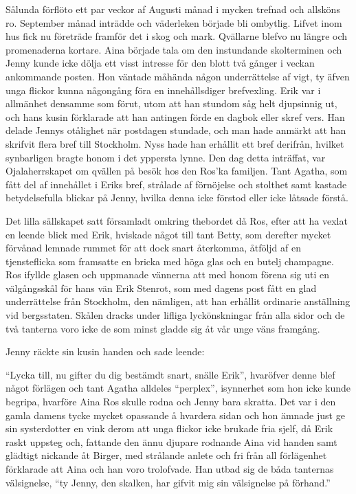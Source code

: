Sålunda förflöto ett par veckor af Augusti månad i mycken trefnad och
allsköns ro. September månad inträdde och väderleken började bli
ombytlig. Lifvet inom hus fick nu företräde framför det i skog och mark.
Qvällarne blefvo nu längre och promenaderna kortare. Aina började tala
om den instundande skolterminen och Jenny kunde icke dölja ett visst
intresse för den blott två gånger i veckan ankommande posten. Hon
väntade måhända någon underrättelse af vigt, ty äfven unga flickor kunna
någongång föra en innehållsdiger brefvexling. Erik var i allmänhet
densamme som förut, utom att han stundom såg helt djupsinnig ut, och
hans kusin förklarade att han antingen förde en dagbok eller skref vers.
Han delade Jennys otålighet när postdagen stundade, och man hade anmärkt
att han skrifvit flera bref till Stockholm. Nyss hade han erhållit ett
bref derifrån, hvilket synbarligen bragte honom i det yppersta lynne.
Den dag detta inträffat, var Ojalaherrskapet om qvällen på besök hos den
Ros'ka familjen. Tant Agatha, som fått del af innehållet i Eriks bref,
strålade af förnöjelse och stolthet samt kastade betydelsefulla blickar
på Jenny, hvilka denna icke förstod eller icke låtsade förstå.

Det lilla sällskapet satt församladt omkring thebordet då Ros, efter att
ha vexlat en leende blick med Erik, hviskade något till tant Betty, som
derefter mycket förvånad lemnade rummet för att dock snart återkomma,
åtföljd af en tjensteflicka som framsatte en bricka med höga glas och en
butelj champagne. Ros ifyllde glasen och uppmanade vännerna att med
honom förena sig uti en välgångsskål för hans vän Erik Stenrot, som med
dagens post fått en glad underrättelse från Stockholm, den nämligen, att
han erhållit ordinarie anställning vid bergsstaten. Skålen dracks under
lifliga lyckönskningar från alla sidor och de två tanterna voro icke de
som minst gladde sig åt vår unge väns framgång.

Jenny räckte sin kusin handen och sade leende:

``Lycka till, nu gifter du dig bestämdt snart, snälle Erik'', hvaröfver
denne blef något förlägen och tant Agatha alldeles ``perplex'',
isynnerhet som hon icke kunde begripa, hvarföre Aina Ros skulle rodna
och Jenny bara skratta. Det var i den gamla damens tycke mycket
opassande å hvardera sidan och hon ämnade just ge sin systerdotter en
vink derom att unga flickor icke brukade fria sjelf, då Erik raskt
uppsteg och, fattande den ännu djupare rodnande Aina vid handen samt
glädtigt nickande åt Birger, med strålande anlete och fri från all
förlägenhet förklarade att Aina och han voro trolofvade. Han utbad sig
de båda tanternas välsignelse, ``ty Jenny, den skalken, har gifvit mig
sin välsignelse på förhand.''

